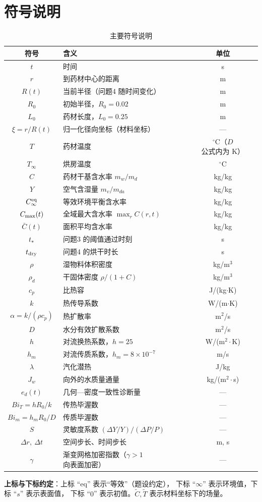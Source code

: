 \section{符号说明}

\begin{table}[H]
  \centering
  \caption{主要符号说明}
  \label{tab:symbols}
  \footnotesize
  \begin{tabularx}{\textwidth}{@{}cXc@{}}
    \toprule
    符号 & 含义 & 单位 \\
    \midrule
    $t$ & 时间 & s \\
    $r$ & 到药材中心的距离 & m \\
    $R(t)$ & 当前半径（问题4 随时间变化） & m \\
    $R_0$ & 初始半径，$R_0=0.02$ & m \\
    $L_0$ & 药材长度，$L_0=0.25$ & m \\
    $\xi=r/R(t)$ & 归一化径向坐标（材料坐标） & --- \\
    $T$ & 药材温度 & $^\circ$C（$D$ 公式内为 K） \\
    $T_\infty$ & 烘房温度 & $^\circ$C \\
    $C$ & 药材干基含水率 $m_w/m_d$ & kg/kg \\
    $Y$ & 空气含湿量 $m_v/m_{da}$ & kg/kg \\
    $C_\infty^{\mathrm{eq}}$ & 等效环境平衡含水率 & kg/kg \\
    $C_{\max}(t)$ & 全域最大含水率 $\max_r C(r,t)$ & kg/kg \\
    $\bar C(t)$ & 面积平均含水率 & kg/kg \\
    $t_{*}$ & 问题3 的阈值通过时刻 & s \\
    $t_{\mathrm{dry}}$ & 问题4 的烘干时长 & s \\
    $\rho$ & 湿物料体积密度 & kg/m$^3$ \\
    $\rho_d$ & 干固体密度 $\rho/(1+C)$ & kg/m$^3$ \\
    $c_p$ & 比热容 & J/(kg$\cdot$K) \\
    $k$ & 热传导系数 & W/(m$\cdot$K) \\
    $\alpha=k/(\rho c_p)$ & 热扩散率 & m$^2$/s \\
    $D$ & 水分有效扩散系数 & m$^2$/s \\
    $h$ & 对流换热系数，$h=25$ & W/(m$^2\cdot$K) \\
    $h_m$ & 对流传质系数，$h_m=8\times10^{-7}$ & m/s \\
    $\lambda$ & 汽化潜热 & J/kg \\
    $J_w$ & 向外的水质量通量 & kg/(m$^2\cdot$s) \\
    $e_d(t)$ & 几何—密度一致性诊断量 & --- \\
    $Bi_T=hR_0/k$ & 传热毕渥数 & --- \\
    $Bi_m=h_mR_0/D$ & 传质毕渥数 & --- \\
    $S$ & 灵敏度系数 $(\Delta Y/Y)/(\Delta P/P)$ & --- \\
    $\Delta r,\ \Delta t$ & 空间步长、时间步长 & m, s \\
    $\gamma$ & 渐变网格加密指数（$\gamma>1$ 向表面加密） & --- \\
    \bottomrule
  \end{tabularx}
\end{table}

\noindent\textbf{上标与下标约定}：上标 ``eq'' 表示``等效''（题设约定），
下标 ``$\infty$'' 表示环境值，下标 ``$s$'' 表示表面值，
下标 ``$0$'' 表示初值。$\widetilde{C},\widetilde{T}$ 表示材料坐标下的场量。
